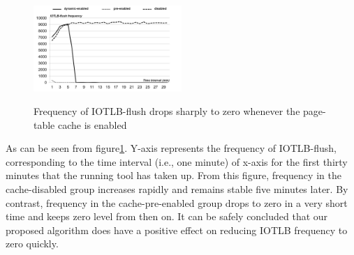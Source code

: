 \begin{figure}[ht]
\centering
\includegraphics[width=0.5\textwidth]{image/micro/iotlbflush.png} \\
\caption{Frequency of IOTLB-flush drops sharply to zero whenever the page-table cache is enabled}
\label{fig:iotlbflush}
\end{figure}

As can be seen from figure\ref{fig:iotlbflush}. Y-axis represents the frequency of IOTLB-flush, corresponding to the time interval (i.e., one minute) of x-axis for the first thirty minutes that the running tool has taken up. From this figure, frequency in the cache-disabled group increases rapidly and remains stable five minutes later. By contrast, frequency in the cache-pre-enabled group drops to zero in a very short time and keeps zero level from then on. It can be safely concluded that our proposed algorithm does have a positive effect on reducing IOTLB frequency to zero quickly.


